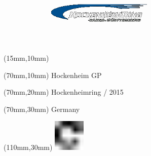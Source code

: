 \null\newpage
\begin{textblock*}{50mm}(15mm,10mm)%
\includegraphics[width=50mm]{LG/HOC.png}
\end{textblock*}
\begin{textblock*}{130mm}(70mm,10mm)%
{\fontsize{20}{20}\selectfont Hockenheim GP}\\
\end{textblock*}
\begin{textblock*}{120mm}(70mm,20mm)%
{\fontsize{16}{16}\selectfont Hockenheimring / 2015}\\
\end{textblock*}
\begin{textblock*}{120mm}(70mm,30mm)%
{\fontsize{12}{12}\selectfont Germany}
\end{textblock*}
\begin{textblock*}{30mm}(110mm,30mm)%
\centering
\includegraphics[height=15mm]{icons/fa-rotate-right.pdf}
\end{textblock*}
